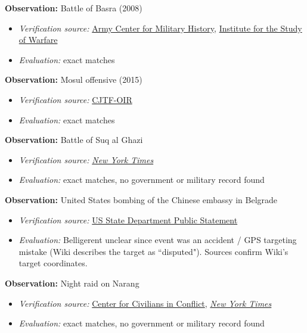 \documentclass[fleqn,12pt]{article}
\begin{document}
\textbf{Observation:} Battle of Basra (2008)
\begin{itemize}
    \item \textit{Verification source:} \href{{https://history.army.mil/html/books/059/59-3-1/CMH_59-3-1.pdf}}{Army Center for Military History}, \href{https://www.understandingwar.org/report/battle-basra}{Institute for the Study of Warfare}
    \item \textit{Evaluation:} exact matches
\end{itemize}

\textbf{Observation:} Mosul offensive (2015)
\begin{itemize}
    \item \textit{Verification source:} \href{https://www.inherentresolve.mil/NEWSROOM/Strike-Releases/}{CJTF-OIR}
    \item \textit{Evaluation:} exact matches
\end{itemize}

\textbf{Observation:} Battle of Suq al Ghazi
\begin{itemize}
    \item \textit{Verification source:} \href{https://www.nytimes.com/2014/09/16/world/middleeast/us-airstrikes-hit-targets-near-baghdad-held-by-isis.html?_r=0}{\textit{New York Times}}
    \item \textit{Evaluation:} exact matches, no government or military record found
\end{itemize}

\textbf{Observation:} United States bombing of the Chinese embassy in Belgrade
\begin{itemize}
    \item \textit{Verification source:} \href{https://1997-2001.state.gov/policy_remarks/1999/990617_pickering_emb.html}{US State Department Public Statement}
    \item \textit{Evaluation:} Belligerent unclear since event was an accident / GPS targeting mistake (Wiki describes the target as ``disputed"). Sources confirm Wiki's target coordinates.
\end{itemize}

\textbf{Observation:} Night raid on Narang
\begin{itemize}
    \item \textit{Verification source:} \href{https://civiliansinconflict.org/wp-content/uploads/2021/10/In-Search-of-Answers-Report_Amended.pdf}{Center for Civilians in Conflict}, \href{https://www.nytimes.com/2009/12/31/world/asia/31afghan.html}{\textit{New York Times}}
    \item \textit{Evaluation:} exact matches, no government or military record found
\end{itemize}
\end{document}
